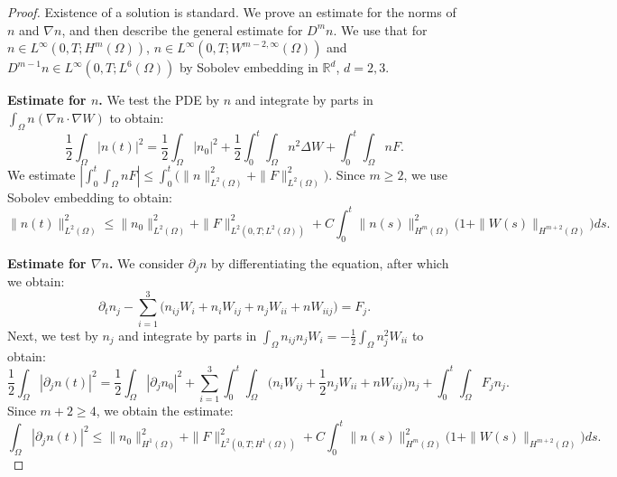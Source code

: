 \documentclass[12pt]{article}
\def\R{{\mathbb R}}
\theoremstyle{plain}
\begin{document}
\begin{proof}
    Existence of a solution is standard. We prove an estimate for the norms of $n$ and $\nabla n$, and then describe the general estimate for $D^{m}n$. We use that for $n \in L^{\infty}(0, T; H^{m}(\Omega))$, $n \in L^{\infty}(0, T; W^{m - 2, \infty}(\Omega))$ and $D^{m - 1}n \in L^{\infty}(0, T; L^{6}(\Omega))$ by Sobolev embedding in $\R^{d}$, $d = 2, 3$.

    \medskip

    \noindent \textbf{Estimate for $n$.} We test the PDE by $n$ and integrate by parts in $\displaystyle \int_{\Omega} n(\nabla n \cdot \nabla W)$ to obtain:
    \begin{equation*}
    \frac{1}{2} \int_{\Omega} |n(t)|^{2} = \frac{1}{2} \int_{\Omega} |n_{0}|^{2} + \frac{1}{2} \int_{0}^{t} \int_{\Omega} n^{2} \Delta W + \int_{0}^{t} \int_{\Omega} nF.
    \end{equation*}
    We estimate $\displaystyle 
    \left|\int_{0}^{t} \int_{\Omega} nF\right| \le \int_{0}^{t} \Big(\|n\|^{2}_{L^{2}(\Omega)} + \|F\|^{2}_{L^{2}(\Omega)}\Big)$. Since $m \ge 2$, we use Sobolev embedding to obtain:
    \begin{equation*}
    \|n(t)\|_{L^{2}(\Omega)}^{2} \le \|n_{0}\|_{L^{2}(\Omega)}^{2} + \|F\|^{2}_{L^{2}(0, T; L^{2}(\Omega))} + C\int_{0}^{t} \|n(s)\|_{H^{m}(\Omega)}^{2} \Big(1 + \|W(s)\|_{H^{m + 2}(\Omega)}\Big)ds.
    \end{equation*}

    \medskip

    \noindent \textbf{Estimate for $\nabla n$.} We consider $\partial_{j}n$ by differentiating the equation, after which we obtain:
    \begin{equation*}
        \partial_{t}n_{j} - \sum_{i = 1}^{3} \Big(n_{ij} W_{i} + n_{i}W_{ij} + n_{j}W_{ii} + nW_{iij}\Big) = F_{j}.
    \end{equation*}
    Next, we test by $n_{j}$ and integrate by parts in $\displaystyle \int_{\Omega} n_{ij} n_{j} W_{i} = -\frac{1}{2}\int_{\Omega} n_{j}^{2} W_{ii}$ to obtain:
    \begin{equation*}
    \frac{1}{2} \int_{\Omega} |\partial_{j}n(t)|^{2} = \frac{1}{2} \int_{\Omega} |\partial_{j}n_{0}|^{2} + \sum_{i = 1}^{3} \int_{0}^{t} \int_{\Omega} \Big(n_{i}W_{ij} + \frac{1}{2}n_{j}W_{ii} + nW_{iij}\Big) n_{j} + \int_{0}^{t} \int_{\Omega} F_{j}n_{j}.
    \end{equation*}
    Since $m + 2 \ge 4$, we obtain the estimate:
    \begin{equation*}
    \int_{\Omega} |\partial_{j}n(t)|^{2} \le \|n_{0}\|_{H^{1}(\Omega)}^{2} + \|F\|_{L^{2}(0, T; H^{1}(\Omega))}^{2} + C\int_{0}^{t} \|n(s)\|_{H^{m}(\Omega)}^{2} \Big(1 + \|W(s)\|_{H^{m + 2}(\Omega)}\Big) ds.
    \end{equation*}


\end{proof}
\end{document}
